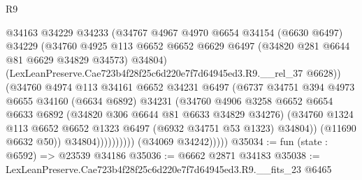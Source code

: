 \begin{lexlean}{R9}
\begin{coremodule}
                              @34163
                              @34229
                              @34233
                              (@34767
                                @4967
                                @4970
                                @6654
                                @34154
                                (@6630 @6497)
                                @34229
                                (@34760
                                  @4925
                                  @113
                                  @6652
                                  @6652
                                  @6629
                                  @6497
                                  (@34820 @281 @6644 @81 @6629 @34829 @34573)
                                  @34804)
                                (LexLeanPreserve.Cae723b4f28f25c6d220e7f7d64945ed3.R9.__rel_37
                                  @6628))
                              (@34760
                                @4974
                                @113
                                @34161
                                @6652
                                @34231
                                @6497
                                (@6737
                                  @34751
                                  @394
                                  @4973
                                  @6655
                                  @34160
                                  (@6634 @6892)
                                  @34231
                                  (@34760
                                    @4906
                                    @3258
                                    @6652
                                    @6654
                                    @6633
                                    @6892
                                    (@34820 @306 @6644 @81 @6633 @34829 @34276)
                                    (@34760
                                      @1324
                                      @113
                                      @6652
                                      @6652
                                      @1323
                                      @6497
                                      (@6932 @34751 @53 @1323)
                                      @34804))
                                  (@11690 @6632 @50))
                                @34804))))))))))
            (@34069 @34242)))))
@35034 := fun (state : @6592) => @23539 @34186
@35036 := @6662 @2871 @34183
@35038 := LexLeanPreserve.Cae723b4f28f25c6d220e7f7d64945ed3.R9.__fits_23 @6465

\end{coremodule}
\end{lexlean}
